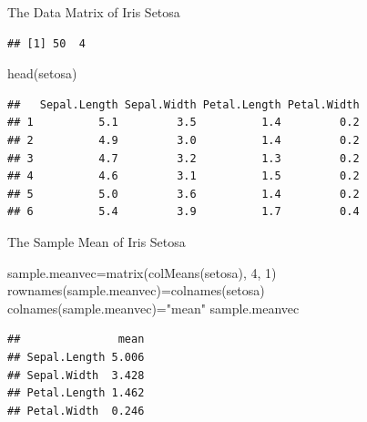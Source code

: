 \documentclass[
  ignorenonframetext,
]{beamer}
\newenvironment{Shaded}{\begin{snugshade}}{\end{snugshade}}
\newcommand{\DecValTok}[1]{\textcolor[rgb]{0.00,0.00,0.81}{#1}}
\newcommand{\FunctionTok}[1]{\textcolor[rgb]{0.00,0.00,0.00}{#1}}
\newcommand{\NormalTok}[1]{#1}
\newcommand{\OtherTok}[1]{\textcolor[rgb]{0.56,0.35,0.01}{#1}}
\newcommand{\SpecialCharTok}[1]{\textcolor[rgb]{0.00,0.00,0.00}{#1}}
\newcommand{\StringTok}[1]{\textcolor[rgb]{0.31,0.60,0.02}{#1}}
\begin{document}
\begin{frame}[fragile]{The Data Matrix of Iris Setosa}
\protect\hypertarget{the-data-matrix-of-iris-setosa}{}
\begin{Shaded}
\end{Shaded}

\begin{verbatim}
## [1] 50  4
\end{verbatim}

\begin{Shaded}
\begin{Highlighting}[]
\FunctionTok{head}\NormalTok{(setosa)}
\end{Highlighting}
\end{Shaded}

\begin{verbatim}
##   Sepal.Length Sepal.Width Petal.Length Petal.Width
## 1          5.1         3.5          1.4         0.2
## 2          4.9         3.0          1.4         0.2
## 3          4.7         3.2          1.3         0.2
## 4          4.6         3.1          1.5         0.2
## 5          5.0         3.6          1.4         0.2
## 6          5.4         3.9          1.7         0.4
\end{verbatim}
\end{frame}

\begin{frame}[fragile]{The Sample Mean of Iris Setosa}
\protect\hypertarget{the-sample-mean-of-iris-setosa}{}
\begin{Shaded}
\begin{Highlighting}[]
\NormalTok{sample.meanvec}\OtherTok{=}\FunctionTok{matrix}\NormalTok{(}\FunctionTok{colMeans}\NormalTok{(setosa), }\DecValTok{4}\NormalTok{, }\DecValTok{1}\NormalTok{)}
\FunctionTok{rownames}\NormalTok{(sample.meanvec)}\OtherTok{=}\FunctionTok{colnames}\NormalTok{(setosa)}
\FunctionTok{colnames}\NormalTok{(sample.meanvec)}\OtherTok{=}\StringTok{"mean"}
\NormalTok{sample.meanvec}
\end{Highlighting}
\end{Shaded}

\begin{verbatim}
##               mean
## Sepal.Length 5.006
## Sepal.Width  3.428
## Petal.Length 1.462
## Petal.Width  0.246
\end{verbatim}
\end{frame}
\end{document}
